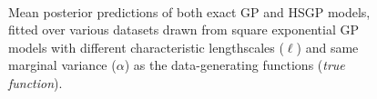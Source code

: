 \documentclass[onecolumn,a4paper,11pt]{article}
\begin{document}
\begin{figure}
\\
\vspace{-3mm}
\caption{Mean posterior predictions of both exact GP and HSGP models, fitted over various datasets drawn from square exponential GP models with different characteristic lengthscales ($\ell$) and same marginal variance ($\alpha$) as the data-generating functions (\textit{true function}). %
}
  \label{fig7_posterior_varing_lscale_part1}
\end{figure}
\end{document}
